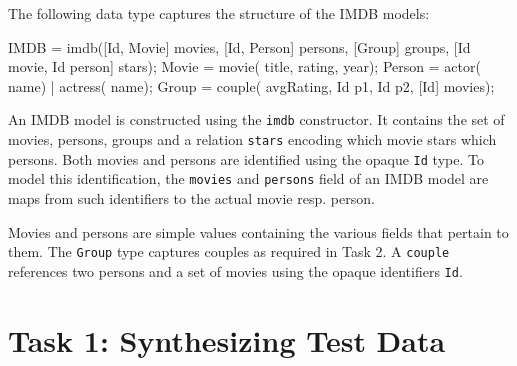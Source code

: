 \documentclass[submission,copyright,creativecommons]{eptcs}
\begin{document}
The following data type captures the structure of the IMDB models:
\begin{rascal}
 IMDB   = imdb([Id, Movie] movies, [Id, Person] persons, 
                   [Group] groups, [Id movie, Id person] stars);
 Movie  = movie( title,  rating,  year);
 Person = actor( name) | actress( name);
 Group  = couple( avgRating, Id p1, Id p2, [Id] movies);
\end{rascal}

An IMDB model is constructed using the \texttt{imdb} constructor. It contains the set of movies, persons, groups and a relation \texttt{stars} encoding which movie stars which persons. 
Both movies and persons are identified using the opaque \texttt{Id} type. 
To model this identification, the \texttt{movies} and \texttt{persons} field of an IMDB model are maps from such identifiers to the actual movie resp. person. 

Movies and persons are simple values containing the various fields that pertain to them. 
The \texttt{Group} type captures couples as required in Task 2. A \texttt{couple} references two persons and a set of movies using the opaque identifiers \texttt{Id}. 



\section{Task 1: Synthesizing Test Data}
\end{document}
